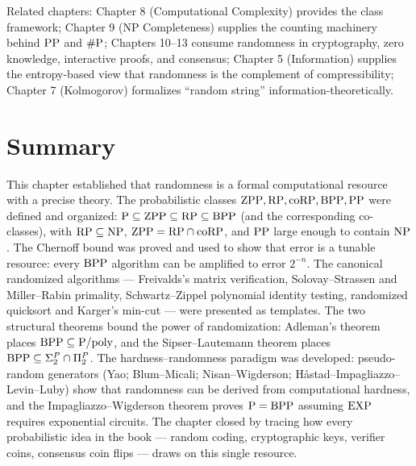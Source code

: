Related chapters: Chapter 8 (Computational Complexity) provides the class framework; Chapter 9 (NP Completeness) supplies the counting machinery behind $\text{PP}$ and $\#\text{P}$; Chapters 10--13 consume randomness in cryptography, zero knowledge, interactive proofs, and consensus; Chapter 5 (Information) supplies the entropy-based view that randomness is the complement of compressibility; Chapter 7 (Kolmogorov) formalizes ``random string'' information-theoretically.

\section{Summary}
\label{sec:randomized:summary}

This chapter established that randomness is a formal computational resource with a precise theory. The probabilistic classes $\text{ZPP}, \text{RP}, \text{coRP}, \text{BPP}, \text{PP}$ were defined and organized: $\text{P} \subseteq \text{ZPP} \subseteq \text{RP} \subseteq \text{BPP}$ (and the corresponding co-classes), with $\text{RP} \subseteq \text{NP}$, $\text{ZPP} = \text{RP} \cap \text{coRP}$, and $\text{PP}$ large enough to contain $\text{NP}$. The Chernoff bound was proved and used to show that error is a tunable resource: every $\text{BPP}$ algorithm can be amplified to error $2^{-n}$. The canonical randomized algorithms --- Freivalds's matrix verification, Solovay--Strassen and Miller--Rabin primality, Schwartz--Zippel polynomial identity testing, randomized quicksort and Karger's min-cut --- were presented as templates. The two structural theorems bound the power of randomization: Adleman's theorem places $\text{BPP} \subseteq \text{P}/\text{poly}$, and the Sipser--Lautemann theorem places $\text{BPP} \subseteq \Sigma_2^P \cap \Pi_2^P$. The hardness--randomness paradigm was developed: pseudo-random generators (Yao; Blum--Micali; Nisan--Wigderson; H{\aa}stad--Impagliazzo--Levin--Luby) show that randomness can be derived from computational hardness, and the Impagliazzo--Wigderson theorem proves $\text{P} = \text{BPP}$ assuming $\text{EXP}$ requires exponential circuits. The chapter closed by tracing how every probabilistic idea in the book --- random coding, cryptographic keys, verifier coins, consensus coin flips --- draws on this single resource.

